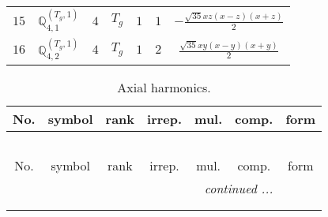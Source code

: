 \documentclass[fleqn,10pt,landscape]{article}
\begin{document}
\begin{itemize}
\begin{center}
\begin{longtable}{ccccccc}
$ 15 $ & $ \mathbb{Q}_{4,1}^{(T_{g},1)} $ & $ 4 $ & $ T_{g} $ & $ 1 $ & $ 1 $ & $ - \frac{\sqrt{35} x z \left(x - z\right) \left(x + z\right)}{2} $ \\
$ 16 $ & $ \mathbb{Q}_{4,2}^{(T_{g},1)} $ & $ 4 $ & $ T_{g} $ & $ 1 $ & $ 2 $ & $ \frac{\sqrt{35} x y \left(x - y\right) \left(x + y\right)}{2} $ \\
\end{longtable}
\end{center}
\begin{center}
\renewcommand{\arraystretch}{1.3}
\begin{longtable}{ccccccc}
\caption{Axial harmonics.}
 \\
 \hline \hline
No. & symbol & rank & irrep. & mul. & comp. & form \\ \hline \endfirsthead

\multicolumn{6}{l}{\tablename\ \thetable{}} \\
 \hline \hline
No. & symbol & rank & irrep. & mul. & comp. & form \\ \hline \endhead

 \hline \hline
\multicolumn{6}{r}{\footnotesize\it continued ...} \\ \endfoot

 \hline \hline
\multicolumn{6}{r}{} \\ \endlastfoot


\end{longtable}
\end{center}
\end{itemize}
\end{document}
